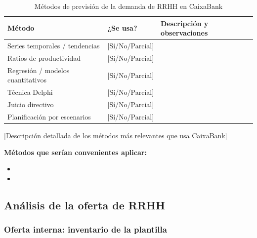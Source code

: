 \begin{table}[H]
  \centering
  \small
  \caption{Métodos de previsión de la demanda de RRHH en CaixaBank}
  \begin{tabularx}{\textwidth}{p{} p{} X}
    \toprule
    \textbf{Método}                  & \textbf{¿Se usa?} & \textbf{Descripción y observaciones} \\
    \midrule
    Series temporales / tendencias   & [Sí/No/Parcial] & \\
    Ratios de productividad          & [Sí/No/Parcial] & \\
    Regresión / modelos cuantitativos & [Sí/No/Parcial] & \\
    Técnica Delphi                   & [Sí/No/Parcial] & \\
    Juicio directivo                 & [Sí/No/Parcial] & \\
    Planificación por escenarios     & [Sí/No/Parcial] & \\
    \bottomrule
  \end{tabularx}
\end{table}

[Descripción detallada de los métodos más relevantes que usa CaixaBank]

\textbf{Métodos que serían convenientes aplicar:}


\begin{itemize}
  \item [Método 1 — justificación]
  \item [Método 2 — justificación]
\end{itemize}

\subsection{Análisis de la oferta de RRHH}

\subsubsection{Oferta interna: inventario de la plantilla}

